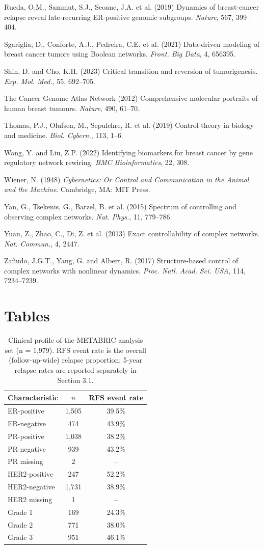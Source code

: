 \documentclass[12pt]{article}
\begin{document}
Rueda, O.M., Sammut, S.J., Seoane, J.A. et al. (2019) Dynamics of breast-cancer relapse reveal late-recurring ER-positive genomic subgroups. \emph{Nature}, 567, 399--404.

Sgariglia, D., Conforte, A.J., Pedreira, C.E. et al. (2021) Data-driven modeling of breast cancer tumors using Boolean networks. \emph{Front. Big Data}, 4, 656395.

Shin, D. and Cho, K.H. (2023) Critical transition and reversion of tumorigenesis. \emph{Exp. Mol. Med.}, 55, 692--705.

The Cancer Genome Atlas Network (2012) Comprehensive molecular portraits of human breast tumours. \emph{Nature}, 490, 61--70.

Thomas, P.J., Olufsen, M., Sepulchre, R. et al. (2019) Control theory in biology and medicine. \emph{Biol. Cybern.}, 113, 1--6.

Wang, Y. and Liu, Z.P. (2022) Identifying biomarkers for breast cancer by gene regulatory network rewiring. \emph{BMC Bioinformatics}, 22, 308.

Wiener, N. (1948) \emph{Cybernetics: Or Control and Communication in the Animal and the Machine}. Cambridge, MA: MIT Press.

Yan, G., Tsekenis, G., Barzel, B. et al. (2015) Spectrum of controlling and observing complex networks. \emph{Nat. Phys.}, 11, 779--786.

Yuan, Z., Zhao, C., Di, Z. et al. (2013) Exact controllability of complex networks. \emph{Nat. Commun.}, 4, 2447.

Za\~nudo, J.G.T., Yang, G. and Albert, R. (2017) Structure-based control of complex networks with nonlinear dynamics. \emph{Proc. Natl. Acad. Sci. USA}, 114, 7234--7239.

\section*{Tables}

\begin{table}[h]
\centering
\caption{Clinical profile of the METABRIC analysis set (n = 1,979). RFS
event rate is the overall (follow-up-wide) relapse proportion; 5-year
relapse rates are reported separately in Section 3.1.}
\label{tab:cohort}
\begin{tabular}{lcc}
\toprule
Characteristic & $n$ & RFS event rate \\
\midrule
ER-positive & 1,505 & 39.5\% \\
ER-negative & 474 & 43.9\% \\
PR-positive & 1,038 & 38.2\% \\
PR-negative & 939 & 43.2\% \\
PR missing & 2 & -- \\
HER2-positive & 247 & 52.2\% \\
HER2-negative & 1,731 & 38.9\% \\
HER2 missing & 1 & -- \\
Grade 1 & 169 & 24.3\% \\
Grade 2 & 771 & 38.0\% \\
Grade 3 & 951 & 46.1\% \\
\bottomrule
\end{tabular}
\end{table}
\end{document}
